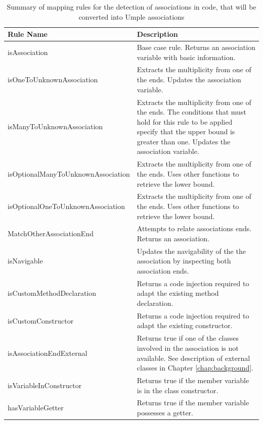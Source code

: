 \begin{table}[h]
\caption{Summary of mapping rules for the detection of associations in code, that will be converted into Umple associations}
\label{table:assocsRules}
\centering
	\begin{tabular}{l|p{8cm}}
		\toprule
		\rowcolor[HTML]{BBDAFF}
        \textbf{Rule Name} & \textbf{Description}  \\ \midrule
        isAssociation & Base case rule. Returns an association variable with basic information.  \\ \hline
        isOneToUnknownAssociation & Extracts the multiplicity from one of the ends. Updates the association variable.  \\ \hline
        isManyToUnknownAssociation &  Extracts the multiplicity from one of the ends. The conditions that must hold for this rule to be applied specify that the upper bound is greater than one. Updates the association variable.  \\ \hline
        isOptionalManyToUnknownAssociation & Extracts the multiplicity from one of the ends. Uses other functions to retrieve the lower bound. \\ \hline
        isOptionalOneToUnknownAssociation & Extracts the multiplicity from one of the ends. Uses other functions to retrieve the lower bound. \\ \hline
        MatchOtherAssociationEnd & Attempts to relate associations ends. Returns an association. \\ \hline
        isNavigable & Updates the navigability of the the association by inspecting both association ends.  \\ \hline
        isCustomMethodDeclaration & Returns a code injection required to adapt the existing method declaration.\\ \hline
        isCustomConstructor  & Returns a code injection required to adapt the existing constructor.  
\\ \hline
\rowcolor{aliceblue} 
        isAssociationEndExternal & Returns true if one of the classes involved in the association is not available. See description of external classes in Chapter \ref{chap:background}.
\\   \hline
\rowcolor{aliceblue} 
        isVariableInConstructor & Returns true if the member variable is in the class constructor.
\\    \hline
\rowcolor{aliceblue}  
        hasVariableGetter & Returns true if the member variable possesses a getter. 
\\   \hline     

\end{tabular}
\end{table}
